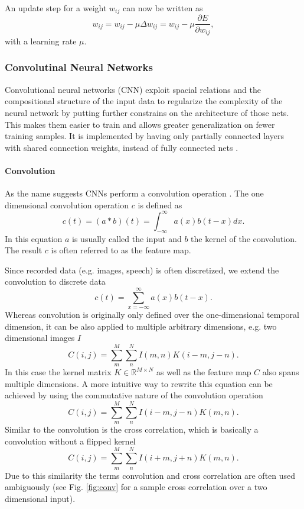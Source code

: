 An update step for a weight $w_{ij}$ can now be written as
\[
w_{ij} = w_{ij} - \mu \Delta w_{ij} = w_{ij} - \mu \frac{\partial E}{\partial w_{ij}},
\]
with a learning rate $\mu$.

\subsubsection{Convolutinal Neural Networks} \label{c:cnns}

Convolutional neural networks (CNN) exploit spacial relations and the compositional structure of the input data to regularize the complexity of the neural network by putting further constrains on the architecture of those nets.
This makes them easier to train and allows greater generalization on fewer training samples.
It is implemented by having only partially connected layers with shared connection weights, instead of fully connected nets \cite{lecun1989backpropagation}\cite{Goodfellow-et-al-2016-Book}.    

\paragraph{Convolution} \label{c:convolution}

As the name suggests CNNs perform a convolution operation \cite{Goodfellow-et-al-2016-Book}. The one dimensional convolution operation $c$ is defined as
\[
c(t) = (a * b)(t) = \int_{- \infty}^{\infty} a(x)b(t-x) dx.
\]
In this equation $a$ is usually called the input and $b$ the kernel of the convolution. The result $c$ is often referred to as the feature map.

Since recorded data (e.g. images, speech) is often discretized, we extend the convolution to discrete data
\[
c(t) = \sum_{x = - \infty}^{\infty} a(x)b(t-x).
\]
Whereas convolution is originally only defined over the one-dimensional temporal dimension, it can be also applied to multiple arbitrary dimensions, e.g. two dimensional images $I$
\[
C(i,j) = \sum_m^M \sum_n^N I(m,n) K(i - m, j -n).
\]
In this case the kernel matrix $K \in \mathbb{R}^{M \times N} $ as well as the feature map $C$ also spans multiple dimensions.
A more intuitive way to rewrite this equation can be achieved by using the commutative nature of the convolution operation
\[
C(i,j) = \sum_m^M \sum_n^N I(i - m,j - n) K(m, n).
\]
Similar to the convolution is the cross correlation, which is basically a convolution without a flipped kernel
\[
C(i,j) = \sum_m^M \sum_n^N I(i + m,j + n) K(m, n).
\]
Due to this similarity the terms convolution and cross correlation are often used ambiguously (see Fig. \ref{fig:conv} for a sample cross correlation over a two dimensional input).

